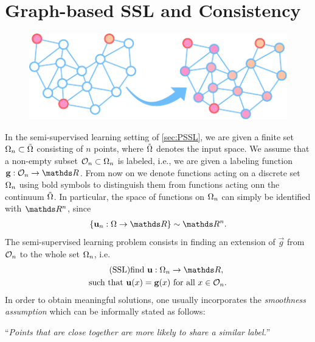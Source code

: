 \section{Graph-based SSL and Consistency}\label{sec:GSSL}


\begin{figure}
\centering
\includegraphics[width=.5\textwidth]{atelier/paradigms/GSSL.pdf}
\end{figure}

In the semi-supervised learning setting of \cref{sec:PSSL}, we are given a finite set $\Omega_n\subset \tilde{\Omega}$ consisting of $n$ points, where $\tilde{\Omega}$ 
denotes the input space. We assume that a non-empty subset $\mathcal{O}_n \subset \Omega_n$ is labeled, i.e., we are given a labeling function
$\vec g:\conset_n\to\R$. From now on we denote functions acting on a discrete set $\Omega_n$ using bold symbols to distinguish them from functions acting onn the continuum $\tilde{\Omega}$. In particular, the space of functions on $\Omega_n$ can simply be identified with $\R^n$, since 
\begin{align*}
\{\vec u_n:\domain\to\R\} \sim \R^n.
\end{align*}
%
\noindent%
The semi-supervised learning problem consists in finding an extension of $\vec g$ from $\mathcal{O}_n$ to the whole set $\Omega_n$, i.e.
%
\begin{gather}\label{eq:SSL}
\begin{gathered}\tag{SSL}
\text{find } \vec u:\domain_n\to\R,\\
\text{such that } \vec u(x) = \vec g(x) \text{ for all } x\in\conset_n.
\end{gathered}
\end{gather}
%
%
%
%
In order to obtain meaningful solutions, one usually incorporates the \emph{smoothness assumption} \cite{subramanya2014graph} which can be informally stated as follows:
%
\begin{center}
\enquote{\textit{Points that are close together are more likely to share a similar label.}}
\end{center}
%
%
